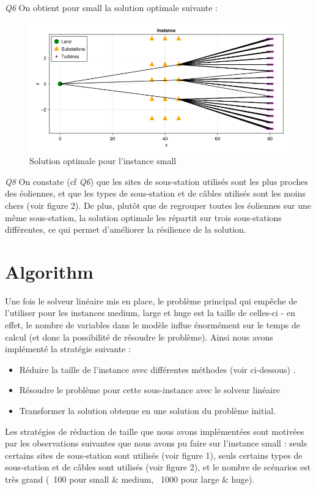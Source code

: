 \documentclass[a4paper,12pt]{article}
\begin{document}
\textit{Q6}
On obtient pour small la solution optimale suivante :
\begin{figure}[h]
    \centering
    \includegraphics[scale=0.2]{small.png}
    \caption{Solution optimale pour l'instance small}
\end{figure}

\textit{Q8}
On constate (cf \textit{Q6}) que les sites de sous-station utilisés sont les plus proches des éoliennes, et que les types de sous-station et de câbles utilisés sont les moins chers (voir figure 2).
De plus, plutôt que de regrouper toutes les éoliennes sur une même sous-station, la solution optimale les répartit sur trois sous-stations différentes, ce qui permet d'améliorer la résilience de la solution.


\section {Algorithm}
Une fois le solveur linéaire mis en place, le problème principal qui empêche de l'utiliser pour les instances medium, large et huge est la taille de celles-ci - en effet, le nombre de variables dans le modèle influe énormément sur le temps de calcul (et donc la possibilité de résoudre le problème). 
Ainsi nous avons implémenté la stratégie suivante :
\\
\begin{itemize}
    \item Réduire la taille de l'instance avec différentes méthodes (voir ci-dessous) .
    \item Résoudre le problème pour cette sous-instance avec le solveur linéaire
    \item Transformer la solution obtenue en une solution du problème initial. \\
\end{itemize}
Les stratégies de réduction de taille que nous avons implémentées sont motivées par les observations suivantes que nous avons pu faire sur l'instance small :
seuls certains sites de sous-station sont utilisés (voir figure 1), seuls certains types de sous-station et de câbles sont utilisés (voir figure 2), et le nombre de scénarios est très grand (~100 pour small \& medium, ~1000 pour large \& huge).
\end{document}
